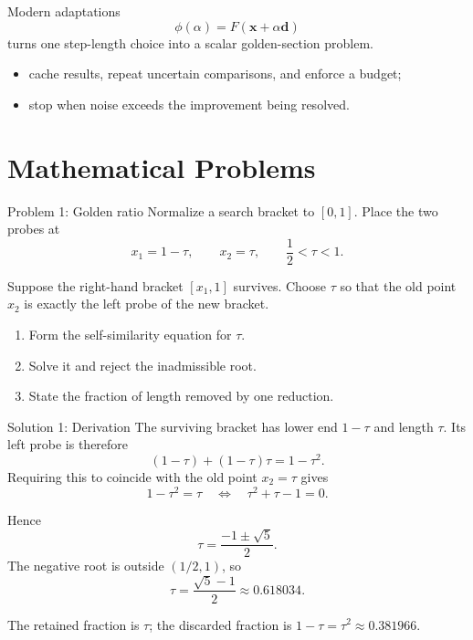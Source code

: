\documentclass[aspectratio=169,11pt,t]{beamer}
\begin{document}
\begin{frame}{Modern adaptations}
  \[
    \phi(\alpha)=F(\mathbf{x}+\alpha\mathbf{d})
  \]
  turns one step-length choice into a scalar golden-section problem.

  \begin{itemize}
    \item cache results, repeat uncertain comparisons, and enforce a budget;
    \item stop when noise exceeds the improvement being resolved.
  \end{itemize}

\end{frame}

\section{Mathematical Problems}

\begin{frame}{Problem 1: Golden ratio}
  Normalize a search bracket to \([0,1]\). Place the two probes at
  \[
    x_1=1-\tau, \qquad x_2=\tau,
    \qquad \frac12<\tau<1.
  \]

  Suppose the right-hand bracket \([x_1,1]\) survives. Choose \(\tau\) so
  that the old point \(x_2\) is exactly the left probe of the new bracket.

  \begin{enumerate}
    \item Form the self-similarity equation for \(\tau\).
    \item Solve it and reject the inadmissible root.
    \item State the fraction of length removed by one reduction.
  \end{enumerate}

\end{frame}

\begin{frame}{Solution 1: Derivation}
  The surviving bracket has lower end \(1-\tau\) and length \(\tau\).
  Its left probe is therefore
  \[
    (1-\tau)+(1-\tau)\tau=1-\tau^2.
  \]
  Requiring this to coincide with the old point \(x_2=\tau\) gives
  \[
    1-\tau^2=\tau
    \quad\Longleftrightarrow\quad
    \tau^2+\tau-1=0.
  \]

  Hence
  \[
    \tau=\frac{-1\pm\sqrt5}{2}.
  \]
  The negative root is outside \((1/2,1)\), so
  \[
    \boxed{\tau=\frac{\sqrt5-1}{2}\approx0.618034}.
  \]

  The retained fraction is \(\tau\); the discarded fraction is
  \(1-\tau=\tau^2\approx0.381966\).
\end{frame}
\end{document}
